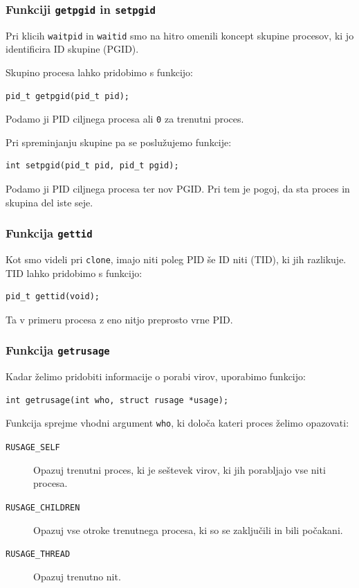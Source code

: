\documentclass[a4paper,12pt,openright]{book}
\begin{document}
\subsubsection{Funkciji \texttt{getpgid} in \texttt{setpgid}}

Pri klicih \texttt{waitpid} in \texttt{waitid} smo na hitro omenili koncept skupine procesov, ki jo identificira ID skupine (PGID).

Skupino procesa lahko pridobimo s funkcijo:
\begin{lstlisting}[style=func]
 pid_t getpgid(pid_t pid);
\end{lstlisting}
Podamo ji PID ciljnega procesa ali \texttt{0} za trenutni proces.

Pri spreminjanju skupine pa se poslužujemo funkcije:
\begin{lstlisting}[style=func]
 int setpgid(pid_t pid, pid_t pgid);
\end{lstlisting}
Podamo ji PID ciljnega procesa ter nov PGID.
Pri tem je pogoj, da sta proces in skupina del iste seje.

\subsubsection{Funkcija \texttt{gettid}}

Kot smo videli pri \texttt{clone}, imajo niti poleg PID še ID niti (TID), ki jih razlikuje.
TID lahko pridobimo s funkcijo:
\begin{lstlisting}[style=func]
 pid_t gettid(void);
\end{lstlisting}
Ta v primeru procesa z eno nitjo preprosto vrne PID.

\subsubsection{Funkcija \texttt{getrusage}}

Kadar želimo pridobiti informacije o porabi virov, uporabimo funkcijo:
\begin{lstlisting}[style=func]
 int getrusage(int who, struct rusage *usage);
\end{lstlisting}

Funkcija sprejme vhodni argument \texttt{who}, ki določa kateri proces želimo opazovati:
\begin{description}
	\item[\texttt{RUSAGE\_SELF}] Opazuj trenutni proces, ki je seštevek virov, ki jih porabljajo vse niti procesa.
	\item[\texttt{RUSAGE\_CHILDREN}] Opazuj vse otroke trenutnega procesa, ki so se zaključili in bili počakani.
	\item[\texttt{RUSAGE\_THREAD}] Opazuj trenutno nit.
\end{description}
\end{document}
